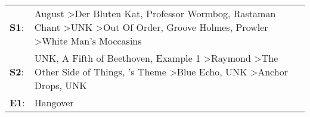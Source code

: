 \begin{supertabular}{p{0.03\textwidth}p{0.92\textwidth}}
 \textbf{S1}:  &                        August\textsuperscript{} \textgreater \enspace Der Bluten Kat\textsuperscript{}, \enspace Professor Wormbog\textsuperscript{}, \enspace Rastaman Chant\textsuperscript{} \textgreater \enspace UNK\textsuperscript{} \textgreater \enspace Out Of Order\textsuperscript{}, \enspace Groove Holmes\textsuperscript{}, \enspace Prowler\textsuperscript{} \textgreater \enspace White Man's Moccasins\textsuperscript{}  \enspace  \\
 \textbf{S2}:  &  UNK\textsuperscript{}, \enspace A Fifth of Beethoven\textsuperscript{}, \enspace Example 1\textsuperscript{} \textgreater \enspace Raymond\textsuperscript{} \textgreater \enspace The Other Side of Things\textsuperscript{}, 's Theme\textsuperscript{} \textgreater \enspace Blue Echo\textsuperscript{}, \enspace UNK\textsuperscript{} \textgreater \enspace Anchor Drops\textsuperscript{}, \enspace UNK\textsuperscript{}  \enspace  \\
 \textbf{E1}:  &                                                                                                                                                                                                                                                                                                                                                                                                                   Hangover\textsuperscript{}  \enspace  \\
\end{supertabular}

